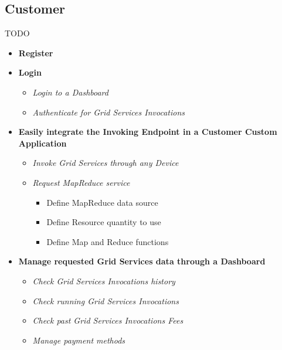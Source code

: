 \subsection{Customer}
TODO

\begin{itemize}
    \item \textbf{Register}\\
    \item \textbf{Login}\\
    \begin{itemize}
        \item \textit{Login to a Dashboard}\\
        \item \textit{Authenticate for Grid Services Invocations}\\
    \end{itemize}
    \item \textbf{Easily integrate the Invoking Endpoint in a Customer Custom Application}\\
    \begin{itemize}
        \item \textit{Invoke Grid Services through any Device}\\
        \item \textit{Request MapReduce service}\\
        \begin{itemize}
            \item Define MapReduce data source\\
            \item Define Resource quantity to use\\
            \item Define Map and Reduce functions\\
        \end{itemize}
    \end{itemize}
    \item \textbf{Manage requested Grid Services data through a Dashboard}\\
    \begin{itemize}
        \item \textit{Check Grid Services Invocations history}\\
        \item \textit{Check running Grid Services Invocations}\\
        \item \textit{Check past Grid Services Invocations Fees}\\
        \item \textit{Manage payment methods}\\
    \end{itemize}
\end{itemize}